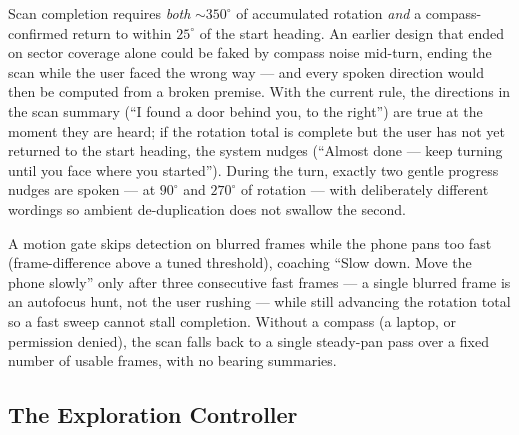 Scan completion requires \emph{both} ${\sim}350^\circ$ of accumulated rotation
\emph{and} a compass-confirmed return to within $25^\circ$ of the start heading. An
earlier design that ended on sector coverage alone could be faked by compass noise
mid-turn, ending the scan while the user faced the wrong way --- and every spoken
direction would then be computed from a broken premise. With the current rule, the
directions in the scan summary (``I found a door behind you, to the right'') are
true at the moment they are heard; if the rotation total is complete but the user
has not yet returned to the start heading, the system nudges (``Almost done ---
keep turning until you face where you started''). During the turn, exactly two
gentle progress nudges are spoken --- at $90^\circ$ and $270^\circ$ of rotation ---
with deliberately different wordings so ambient de-duplication does not swallow the
second.

A motion gate skips detection on blurred frames while the phone pans too fast
(frame-difference above a tuned threshold), coaching ``Slow down. Move the phone
slowly'' only after three consecutive fast frames --- a single blurred frame is an
autofocus hunt, not the user rushing --- while still advancing the rotation total so
a fast sweep cannot stall completion. Without a compass (a laptop, or permission
denied), the scan falls back to a single steady-pan pass over a fixed number of
usable frames, with no bearing summaries.

\subsection{The Exploration Controller}
\label{sec:exploration_controller}

